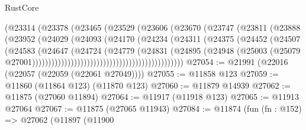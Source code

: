 \begin{lexlean}{RustCore}
\begin{coremodule}
                                            (@23314
                                              (@23378
                                                (@23465
                                                  (@23529
                                                    (@23606
                                                      (@23670
                                                        (@23747
                                                          (@23811
                                                            (@23888
                                                              (@23952
                                                                (@24029
                                                                  (@24093
                                                                    (@24170
                                                                      (@24234
                                                                        (@24311
                                                                          (@24375
                                                                            (@24452
                                                                              (@24507
                                                                                (@24583
                                                                                  (@24647
                                                                                    (@24724
                                                                                      (@24779
                                                                                        (@24831
                                                                                          (@24895
                                                                                            (@24948
                                                                                              (@25003
                                                                                                (@25079
                                                                                                  @27001)))))))))))))))))))))))))))))))))))))))))))))))
@27054 := @21991 (@22016 (@22057 (@22059 (@22061 @27049))))
@27055 := @11858 @123
@27059 := @11860 (@11864 @123) (@11870 @123)
@27060 := @11879 @14939
@27062 := @11875 (@27060 @11894)
@27064 := @11917 (@11918 @123)
@27065 := @11913 @27064
@27067 := @11875 (@27065 @11943)
@27084 := @11874
    (fun (fn : @152) =>
    @27062
      (@11897
        (@11900

\end{coremodule}
\end{lexlean}
